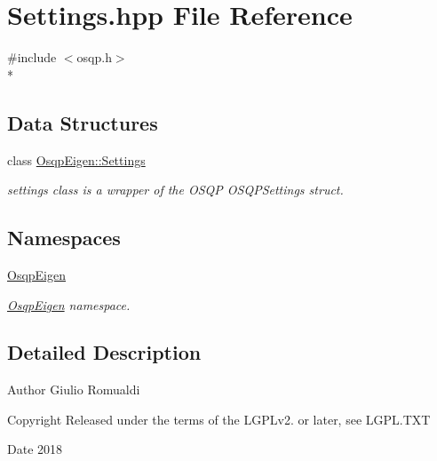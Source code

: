 \section{Settings.\+hpp File Reference}
\label{Settings_8hpp}
{\ttfamily \#include $<$osqp.\+h$>$}\\*
\subsection*{Data Structures}
\begin{DoxyCompactItemize}
\item 
class \hyperlink{classOsqpEigen_1_1Settings}{Osqp\+Eigen\+::\+Settings}
\begin{DoxyCompactList}\small\item\em settings class is a wrapper of the O\+S\+QP O\+S\+Q\+P\+Settings struct. \end{DoxyCompactList}\end{DoxyCompactItemize}
\subsection*{Namespaces}
\begin{DoxyCompactItemize}
\item 
 \hyperlink{namespaceOsqpEigen}{Osqp\+Eigen}
\begin{DoxyCompactList}\small\item\em \hyperlink{namespaceOsqpEigen}{Osqp\+Eigen} namespace. \end{DoxyCompactList}\end{DoxyCompactItemize}


\subsection{Detailed Description}
\begin{DoxyAuthor}{Author}
Giulio Romualdi 
\end{DoxyAuthor}
\begin{DoxyCopyright}{Copyright}
Released under the terms of the L\+G\+P\+Lv2. or later, see L\+G\+P\+L.\+T\+XT 
\end{DoxyCopyright}
\begin{DoxyDate}{Date}
2018 
\end{DoxyDate}
